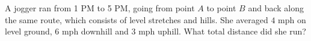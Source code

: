 A jogger ran from 1 PM to 5 PM, going from point $A$ to point $B$ and back along the same route, which consists of level stretches and hills. She averaged $4$ mph on level ground, $6$ mph downhill and $3$ mph uphill. What total distance did she run?
